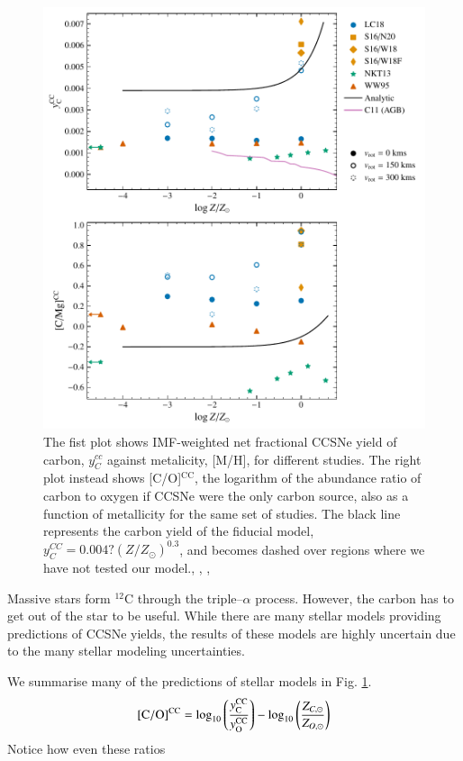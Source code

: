 \documentclass[12pt,oneside]{report}
\newcommand{\sun}{\ensuremath{\odot}}
\begin{document}
\begin{figure}[htp]
    \centering
    \includegraphics{y_c_cc.pdf}
    \caption[CCSNe carbon yields]{The fist plot shows IMF-weighted net fractional CCSNe yield of
        carbon, $y_C^{cc}$ against metalicity, [M/H], for different studies.
        The right plot instead shows [C/O]$^\text{CC}$, the logarithm of the
        abundance ratio of carbon to oxygen if CCSNe were the only carbon
        source, also as a function of metallicity for the same set of studies.
        The black line represents the carbon yield of the fiducial model,
        $y_C^{CC} = 0.004? (Z/Z_{\sun})^{0.3}$, and becomes dashed over regions
        where we have not tested our model.\citep{NKT13}, \citep{LC18},
        \citep{sukhbold+16}, \citep{WW95}
 }
    \label{fig:y_cc}
\end{figure}

Massive stars form $^{12}$C through the triple--$\alpha$ process. However, the carbon has to get out of the star to be useful. 
While there are many stellar models providing predictions of CCSNe yields, the results of these models are highly uncertain due to the many stellar modeling uncertainties. 

We summarise many of the predictions of stellar models in Fig. \ref{fig:y_cc}. 
\begin{equation}
    {\rm [C/O]^{CC}} = \log_{10}\left( \frac{y_{\rm C}^{\rm CC}}{y_{\rm O}^{\rm CC}}\right) - \log_{10} \left( \frac{Z_{C, \sun }}{Z_{O, \sun }} \right)
\end{equation}
Notice how even these ratios 
\end{document}
